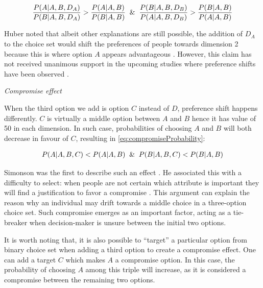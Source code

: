 \documentclass[a4paper,12pt]{article}
\newcommand{\citeyearonly}[1]{\citeyearpar{#1}}
\begin{document}
\begin{equation}\label{eq:attractionProbability}
    \frac{P(A|A,B,D_A)}{P(B|A,B,D_A)} > \frac{P(A|A,B)}{P(B|A,B)} \And \frac{P(B|A,B,D_B)}{P(A|A,B,D_B)} > \frac{P(B|A,B)}{P(A|A,B)}
\end{equation}

Huber noted that albeit other explanations are still possible, the addition of $D_A$ to the choice set would shift the preferences of people towards dimension 2 because this is where option $A$ appears advantageous \cite{huberEtAl82, bhatia2013associations}. However, this claim has not received unanimous support in the upcoming studies where preference shifts have been observed \citep{wedell1991distinguishing}.

\textit{Compromise effect}

When the third option we add is option $C$ instead of $D$, preference shift happens differently. $C$ is virtually a middle option between $A$ and $B$ hence it has value of 50 in each dimension. In such case, probabilities of choosing $A$ and $B$ will both decrease in favour of $C$, resulting in \ref{eq:compromiseProbability}:

\begin{align}\label{eq:compromiseProbability}
    P(A|A,B,C) < P(A|A,B) \And P(B|A,B,C) < P(B|A,B)
\end{align}

Simonson was the first to describe such an effect \citeyearonly{simonson89}. He associated this with a difficulty to select: when people are not certain which attribute is important they will find a justification to favor a compromise \citep{simonson89}. This argument can explain the reason why an individual may drift towards a middle choice in a three-option choice set. Such compromise emerges as an important factor, acting as a tie-breaker when decision-maker is unsure between the initial two options. 

It is worth noting that, it is also possible to ``target'' a particular option from binary choice set when adding a third option to create a compromise effect. One can add a target $C$ which makes $A$ a compromise option. In this case, the probability of choosing $A$ among this triple will increase, as it is considered a compromise between the remaining two options. 
\end{document}
